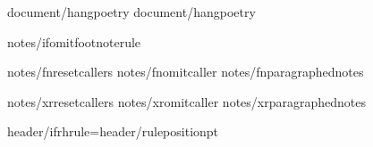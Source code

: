 
{document/hangpoetry}
{document/hangpoetry}



{notes/ifomitfootnoterule}\def\footnoterule{{}} 

{notes/fnresetcallers}
{notes/fnomitcaller}
{notes/fnparagraphednotes}

{notes/xrresetcallers}
{notes/xromitcaller}
{notes/xrparagraphednotes}

\def\HeaderPosition{{{header/headerposition}}}
\def\FooterPosition{{{header/footerposition}}}
{header/ifrhrule}\RHruleposition={header/ruleposition}pt

\def\RHoddleft{{{header/oddleft}}}
\def\RHoddcenter{{{header/oddcenter}}}
\def\RHoddright{{{header/oddright}}}

\def\RHevenleft{{{header/evenright}}}      %
\def\RHevencenter{{{header/evencenter}}}
\def\RHevenright{{{header/evenleft}}}      %



